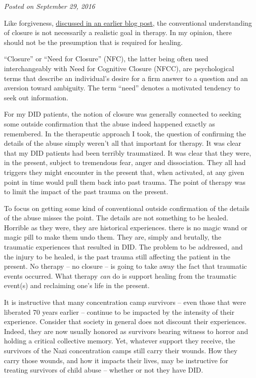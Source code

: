 \documentclass[]{book}
\begin{document}
\emph{Posted on September 29, 2016}

Like forgiveness, \href{https://www.engagingmultiples.com/trap-forgiveness/}{discussed in an earlier blog post}, the conventional understanding of closure is not necessarily a realistic goal in therapy. In my opinion, there should not be the presumption that is required for healing.

``Closure'' or ``Need for Closure'' (NFC), the latter being often used interchangeably with Need for Cognitive Closure (NFCC), are psychological terms that describe an individual's desire for a firm answer to a question and an aversion toward ambiguity. The term ``need'' denotes a motivated tendency to seek out information.

For my DID patients, the notion of closure was generally connected to seeking some outside confirmation that the abuse indeed happened exactly as remembered. In the therapeutic approach I took, the question of confirming the details of the abuse simply weren't all that important for therapy. It was clear that my DID patients had been terribly traumatized. It was clear that they were, in the present, subject to tremendous fear, anger and dissociation. They all had triggers they might encounter in the present that, when activated, at any given point in time would pull them back into past trauma. The point of therapy was to limit the impact of the past trauma on the present.

To focus on getting some kind of conventional outside confirmation of the details of the abuse misses the point. The details are not something to be healed. Horrible as they were, they are historical experiences. there is no magic wand or magic pill to make them undo them. They are, simply and brutally, the traumatic experiences that resulted in DID. The problem to be addressed, and the injury to be healed, is the past trauma still affecting the patient in the present. No therapy -- no closure -- is going to take away the fact that traumatic events occurred. What therapy \emph{can} do is support healing from the traumatic event(s) and reclaiming one's life in the present.

It is instructive that many concentration camp survivors -- even those that were liberated 70 years earlier -- continue to be impacted by the intensity of their experience. Consider that society in general does not discount their experiences. Indeed, they are now usually honored as survivors bearing witness to horror and holding a critical collective memory. Yet, whatever support they receive, the survivors of the Nazi concentration camps still carry their wounds. How they carry those wounds, and how it impacts their lives, may be instructive for treating survivors of child abuse -- whether or not they have DID.
\end{document}
